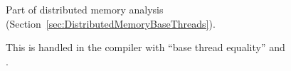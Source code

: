
Part of distributed memory analysis (Section~\ref{sec:DistributedMemoryBaseThreads}).

This is handled in the compiler with ``base thread equality'' and\\.
